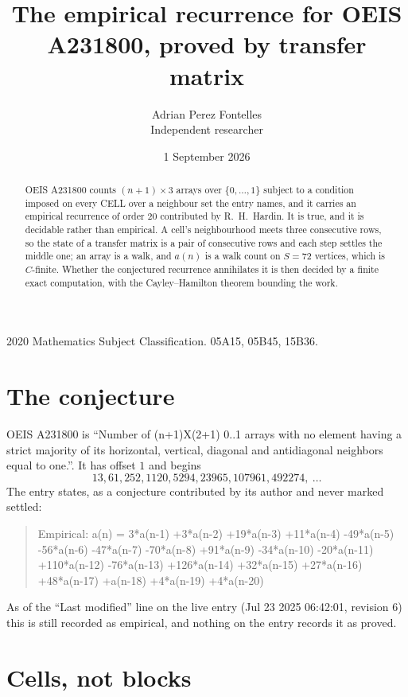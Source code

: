 \documentclass[11pt,a4paper]{article}
\title{The empirical recurrence for OEIS A231800, proved by transfer matrix}
\author{Adrian Perez Fontelles\\ \small Independent researcher}
\date{1 September 2026}
\theoremstyle{plain}
\theoremstyle{definition}
\begin{document}
\maketitle

\begin{abstract}
OEIS A231800 counts $(n+1)\times3$ arrays over $\{0,\dots,1\}$ subject to a condition imposed on
every CELL over a neighbour set the entry names, and it carries an empirical recurrence of
order $20$ contributed by R.~H.~Hardin. It is true, and it is decidable rather than
empirical. A cell's neighbourhood meets three consecutive rows, so the state of a transfer
matrix is a pair of consecutive rows and each step settles the middle one; an array is a
walk, and $a(n)$ is a walk count on $S=72$ vertices, which is $C$-finite. Whether the
conjectured recurrence annihilates it is then decided by a finite exact computation, with the
Cayley--Hamilton theorem bounding the work.
\end{abstract}

\noindent\small 2020 Mathematics Subject Classification. 05A15, 05B45, 15B36.\normalsize

\section{The conjecture}

OEIS A231800 is ``Number of (n+1)X(2+1) 0..1 arrays with no element having a strict majority of its horizontal, vertical, diagonal and antidiagonal neighbors equal to one.''. It has offset $1$ and begins
\[
13, 61, 252, 1120, 5294, 23965, 107961, 492274,\ \dots
\]
The entry states, as a conjecture contributed by its author and never marked settled:
\begin{quote}
Empirical: a(n) = 3*a(n-1) +3*a(n-2) +19*a(n-3) +11*a(n-4) -49*a(n-5) -56*a(n-6) -47*a(n-7) -70*a(n-8) +91*a(n-9) -34*a(n-10) -20*a(n-11) +110*a(n-12) -76*a(n-13) +126*a(n-14) +32*a(n-15) +27*a(n-16) +48*a(n-17) +a(n-18) +4*a(n-19) +4*a(n-20)
\end{quote}
As of the ``Last modified'' line on the live entry (Jul 23 2025 06:42:01, revision 6) this is still
recorded as empirical, and nothing on the entry records it as proved.

\section{Cells, not blocks}
\end{document}
